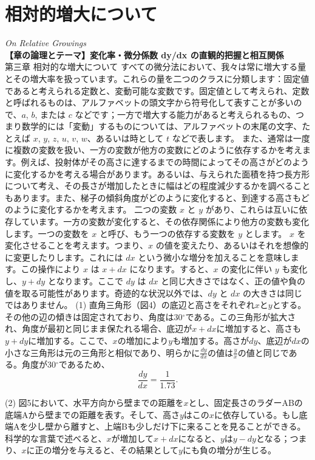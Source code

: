 \documentclass[a4paper,11pt,openany]{ltjsbook}
\begin{document}
\chapter{相対的増大について}
\noindent\textit{\large On Relative Growings}\\[2mm]
\noindent\textbf{\small 【章の論理とテーマ】変化率・微分係数 dy/dx の直観的把握と相互関係}\\[4mm]
第三章 相対的な増大について
すべての微分法において、我々は常に増大する量とその増大率を扱っています。これらの量を二つのクラスに分類します：固定値であると考えられる定数と、変動可能な変数です。固定値として考えられ、定数と呼ばれるものは、アルファベットの頭文字から符号化して表すことが多いので、$a$, $b$, または $c$ などです；一方で増大する能力があると考えられるもの、つまり数学的には「変動」するものについては、アルファベットの末尾の文字、たとえば $x$, $y$, $z$, $u$, $v$, $w$、あるいは時として $t$ などで表します。
また、通常は一度に複数の変数を扱い、一方の変数が他方の変数にどのように依存するかを考えます。例えば、投射体がその高さに達するまでの時間によってその高さがどのように変化するかを考える場合があります。あるいは、与えられた面積を持つ長方形について考え、その長さが増加したときに幅はどの程度減少するかを調べることもあります。また、梯子の傾斜角度がどのように変化すると、到達する高さもどのように変化するかを考えます。
二つの変数 $x$ と $y$ があり、これらは互いに依存しています。一方の変数が変化すると、その依存関係により他方の変数も変化します。一つの変数を $x$ と呼び、もう一つの依存する変数を $y$ とします。
$x$ を変化させることを考えます。つまり、$x$ の値を変えたり、あるいはそれを想像的に変更したりします。これには $dx$ という微小な増分を加えることを意味します。この操作により $x$ は $x + dx$ になります。すると、$x$ の変化に伴い $y$ も変化し、$y + dy$ となります。ここで $dy$ は $dx$ と同じ大きさではなく、正の値や負の値を取る可能性があります。奇迹的な状況以外では、$dy$ と $dx$ の大きさは同じではありません。
(1) 直角三角形（図4）の底辺と高さをそれぞれ$x$と$y$とする。その他の辺の傾きは固定されており、角度は30$^\circ$である。この三角形が拡大され、角度が最初と同じまま保たれる場合、底辺が$x + dx$に増加すると、高さも$y + dy$に増加する。ここで、$x$の増加により$y$も増加する。高さが$dy$、底辺が$dx$の小さな三角形は元の三角形と相似であり、明らかに$\frac{dy}{dx}$の値は$\frac{y}{x}$の値と同じである。角度が30$^\circ$であるため、
\[
\frac{dy}{dx} = \frac{1}{1.73}.
\]

(2) 図5において、水平方向から壁までの距離を$x$とし、固定長さのラダーABの底端Aから壁までの距離を表す。そして、高さ$y$はこの$x$に依存している。もし底端Aを少し壁から離すと、上端Bも少しだけ下に来ることを見ることができる。科学的な言葉で述べると、$x$が増加して$x + dx$になると、$y$は$y - dy$となる；つまり、$x$に正の増分を与えると、その結果として$y$にも負の増分が生じる。
\end{document}
